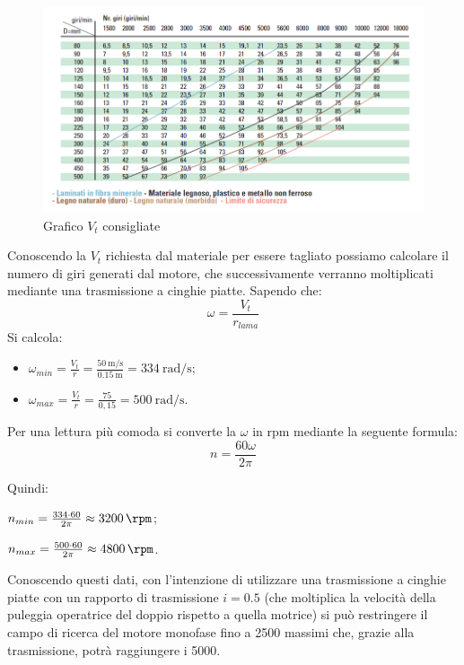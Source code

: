 \documentclass{report}
\begin{document}
\begin{figure}[H]
    \centering
    \includegraphics[width = 1\textwidth]{src/img/Vtaglio_lama_grafico.png}
    \caption{Grafico $V_t$ consigliate}
    \label{fig:grafvtcons}
\end{figure}

Conoscendo la $V_t$ richiesta dal materiale per essere tagliato possiamo calcolare il numero di giri generati dal motore, che successivamente verranno moltiplicati mediante una trasmissione a cinghie piatte.
Sapendo che:
\begin{equation}
  \omega=\frac{V_t}{r_{lama}}
\end{equation}
Si calcola:
\begin{itemize}
\item $\omega_{min} = \frac{V_t}{r} = \frac{\SI{50}{\m\per\s}}{\SI{0,15}{\m}} = \SI{334}{\radian\per\s} $;
\item $\omega_{max}  = \frac{V_t}{r}= \frac{75}{0,15} = \SI{500}{\radian\per\s}$.
\end{itemize}

Per una lettura più comoda si converte la $\omega$ in rpm mediante la seguente formula:
\begin{equation}
  n = \frac{60\omega}{2\pi}
\end{equation}

Quindi:
\begin{description}
\item $n_{min} = \frac{334\cdot 60}{2\pi} \approx \SI{3200}{\rpm}$;
\item $n_{max} = \frac{500\cdot 60}{2\pi} \approx \SI{4800}{\rpm}$.
\end{description}

Conoscendo questi dati, con l’intenzione di utilizzare una trasmissione a cinghie piatte con un rapporto di trasmissione $i = \num{0,5}$ (che moltiplica la velocità della puleggia operatrice del doppio rispetto a quella motrice) si può restringere il campo di ricerca del motore monofase fino a \SI{2500}{\rpm} massimi che, grazie alla trasmissione, potrà raggiungere i \SI{5000}{\rpm}.
\end{document}
